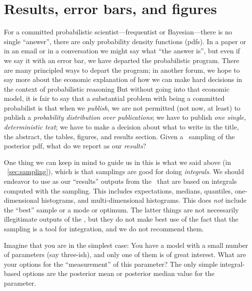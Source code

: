 \documentclass[modern]{aastex61}
\newcommand{\MCMC}{\acronym{MCMC}}
\begin{document}
\section{Results, error bars, and figures}\label{sec:results}
\nopagebreak
For a committed probabilistic scientist---frequentist or
Bayesian---there is no single ``answer'', there are only probability density
functions (pdfs).  In a paper or in an email or in a conversation
we might say what ``the answer is'', but even if we say it with an error
bar, we have departed the probabilistic program.  There are many
principled ways to depart the program; in another forum, we hope to say more
about the economic explanation of how we can make hard decisions in
the context of probabilistic reasoning
But without going into that economic model, it is fair to say that a
substantial problem with being a committed probabilist is that when we
\emph{publish}, we are not permitted (not now, at least) to publish a
\emph{probability distribution over publications}; we have to publish
\emph{one single, deterministic text}; we have to make a decision about what
to write in the title, the abstract, the tables, figures, and results
section.  Given a \MCMC\ sampling of the posterior pdf, what do we
report as our \emph{results}?

One thing we can keep in mind to guide us in this is what we said above
  (in \sectionname~\ref{sec:sampling}),
  which is that samplings are good for doing \emph{integrals}.
We should endeavor to use as our ``results'' outputs from the \MCMC\
  that are based on integrals computed with the sampling.
This includes expectations, medians, quantiles, one-dimensional histograms,
  and multi-dimensional histograms.
This does \emph{not} include the ``best'' sample or a mode or optimum.
The latter things are not necessarily illegitimate outputs of the \MCMC,
  but they do not make best use of the fact that the sampling is a tool for integration,
  and we do not recommend them.

Imagine that you are in the simplest case:
You have a model with a small number of parameters (say three-ish),
  and only one of them is of great interest.
What are your options for the ``measurement'' of this parameter?
The only simple integral-based options are the posterior mean
  or posterior median value for the parameter.
\end{document}
